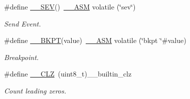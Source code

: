 \begin{DoxyCompactItemize}
\#define \hyperlink{group___c_m_s_i_s___core___instruction_interface_gafa58e60fcd2176ad58f96947466ea1fa}{\+\_\+\+\_\+\+S\+EV}()~\hyperlink{cmsis__iccarm_8h_a1378040bcf22428955c6e3ce9c2053cd}{\+\_\+\+\_\+\+A\+SM} volatile (\char`\"{}sev\char`\"{})
\begin{DoxyCompactList}\small\item\em Send Event. \end{DoxyCompactList}\item 
\#define \hyperlink{group___c_m_s_i_s___core___instruction_interface_ga15ea6bd3c507d3e81c3b3a1258e46397}{\+\_\+\+\_\+\+B\+K\+PT}(value)~\hyperlink{cmsis__iccarm_8h_a1378040bcf22428955c6e3ce9c2053cd}{\+\_\+\+\_\+\+A\+SM} volatile (\char`\"{}bkpt \char`\"{}\#value)
\begin{DoxyCompactList}\small\item\em Breakpoint. \end{DoxyCompactList}\item 
\#define \hyperlink{group___c_m_s_i_s___core___instruction_interface_ga5d5bb1527e042be4a9fa5a33f65cc248}{\+\_\+\+\_\+\+C\+LZ}~(uint8\+\_\+t)\+\_\+\+\_\+builtin\+\_\+clz
\begin{DoxyCompactList}\small\item\em Count leading zeros. \end{DoxyCompactList}\end{DoxyCompactItemize}
